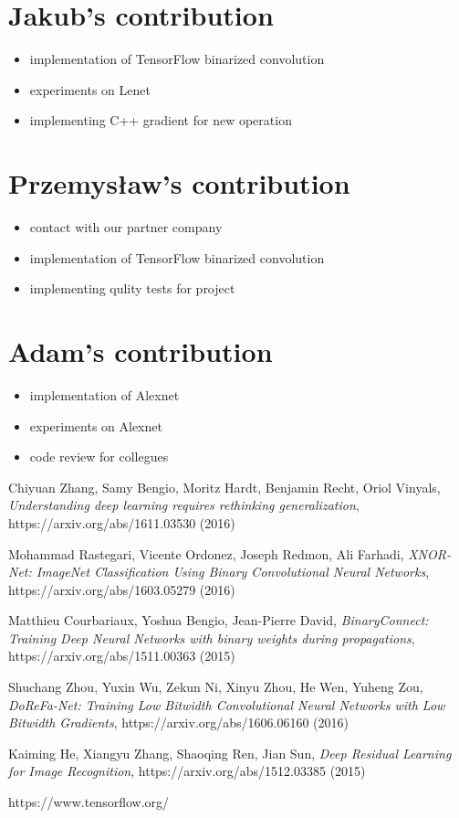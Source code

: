 \documentclass[licencjacka]{pracamgr}
\begin{document}
	\section{Jakub's contribution}
		\begin{itemize}
			\item implementation of TensorFlow binarized convolution
			\item experiments on Lenet
			\item implementing C++ gradient for new operation
		\end{itemize}
	\section{Przemysław's contribution}
		\begin{itemize}
			\item contact with our partner company
			\item implementation of TensorFlow binarized convolution
			\item implementing qulity tests for project
		\end{itemize}
	\section{Adam's contribution}
		\begin{itemize}
			\item implementation of Alexnet
			\item experiments on Alexnet
			\item code review for collegues
		\end{itemize}

\begin{thebibliography}{99}

 Chiyuan Zhang, Samy Bengio, Moritz Hardt, Benjamin Recht, Oriol Vinyals, \textit{Understanding deep learning requires rethinking generalization}, https://arxiv.org/abs/1611.03530 (2016)

 Mohammad Rastegari, Vicente Ordonez, Joseph Redmon, Ali Farhadi, \textit{XNOR-Net: ImageNet Classification Using Binary Convolutional Neural Networks}, https://arxiv.org/abs/1603.05279 (2016)

 Matthieu Courbariaux, Yoshua Bengio, Jean-Pierre David, \textit{BinaryConnect: Training Deep Neural Networks with binary weights during propagations}, https://arxiv.org/abs/1511.00363 (2015)

 Shuchang Zhou, Yuxin Wu, Zekun Ni, Xinyu Zhou, He Wen, Yuheng Zou, \textit{DoReFa-Net: Training Low Bitwidth Convolutional Neural Networks with Low Bitwidth Gradients}, https://arxiv.org/abs/1606.06160 (2016)

 Kaiming He, Xiangyu Zhang, Shaoqing Ren, Jian Sun, \textit{Deep Residual Learning for Image Recognition}, https://arxiv.org/abs/1512.03385 (2015)

 https://www.tensorflow.org/

\end{thebibliography}
\end{document}
